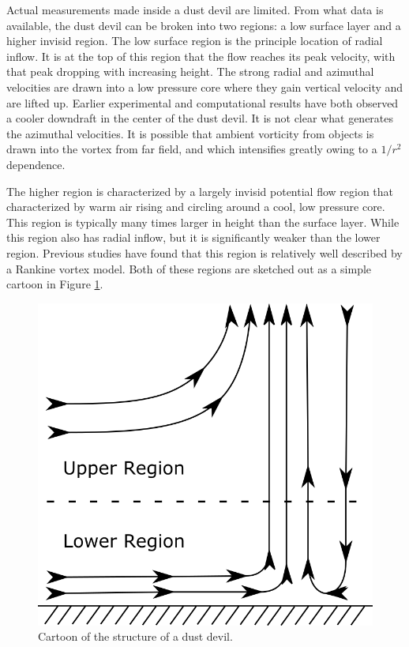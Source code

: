 Actual measurements made inside a dust devil are limited. From what data
is available, the dust devil can be broken into two regions: a low surface 
layer and a higher invisid region. The low surface region is the 
principle location of radial inflow. 
It is at the top of this region that the flow 
reaches its peak velocity, with that peak dropping with increasing height. 
The strong radial and azimuthal velocities are drawn into a low pressure core 
where they gain vertical velocity and are lifted up. Earlier experimental and 
computational results have both observed a cooler downdraft in the center 
of the dust devil. It is not clear what generates the azimuthal velocities. It is 
possible that ambient vorticity from objects is drawn into the vortex from far 
field, and which intensifies greatly owing to a $1/r^2$ dependence.

The higher region is characterized by a largely invisid potential flow region 
that characterized by warm air rising and circling around a cool, 
low pressure core. This region is typically many times larger in height than the
surface layer. While this region also has radial inflow, but it is 
significantly weaker than the lower region. Previous studies have found that
this region is relatively well described by a Rankine vortex
model\cite{}. 
Both of these regions are sketched out as a simple 
cartoon in Figure \ref{fig:cartoon}. 

  \begin{figure}[!htb]
    \begin{center}
     \includegraphics[width = 12 cm]{figs/ground}
     \caption{Cartoon of the structure of a dust devil.}
     \label{fig:cartoon}
    \end{center}
  \end{figure}


